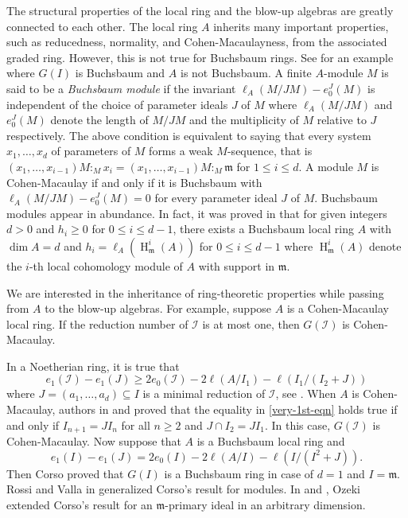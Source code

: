 \documentclass[11pt,reqno]{amsart}
\theoremstyle{definition}
\newcommand{\m}{\mathfrak m}
\def\I{{\mathcal I}}
\DeclareMathOperator{\h}{H}
\numberwithin{equation}{section}
\begin{document}
	The structural properties of the local ring and the blow-up algebras are greatly connected to each other. The local ring $A$ inherits many important properties, such as reducedness, normality, and Cohen-Macaulayness, from the associated graded ring. 
	However, this is not true for Buchsbaum rings. See \cite[Example 4.10]{G84} for an example where $G(I)$ is Buchsbaum and $A$ is not Buchsbaum. A finite $A$-module $M$ is said to be a {\textit{Buchsbaum module}} if the invariant $\ell_A(M/JM)-e_0^J(M)$ is independent of the choice of parameter ideals $J$ of $M$ where $\ell_A(M/JM)$ and $e_0^J(M)$ denote the length of $M/JM$ and the multiplicity of $M$ relative to $J$ respectively. The above condition is equivalent to saying that every system $x_1,\ldots, x_d$ of parameters of $M$ forms a weak $M$-sequence, that is
	$ (x_1,\ldots,x_{i-1})M:_M x_i=(x_1,\ldots,x_{i-1})M:_M \m$ for $1\leq i\leq d.$  A module $M$ is Cohen-Macaulay if and only if it is Buchsbaum with $\ell_A(M/JM)-e_0^J(M)=0$ for every parameter ideal $J$ of $M$. Buchsbaum modules appear in abundance. In fact, it was proved in \cite[Theorem 1.1]{Go1} that for given integers $d>0$ and $h_i\geq 0$ for $0\leq i\leq d-1$,  there exists a Buchsbaum local ring $A$ with $\dim A=d$ and $h_i=\ell_A(\h_\m^i(A))$ for $0\leq i\leq d-1$ where $\h_\m^i(A)$ denote the $i$-th local cohomology module of $A$ with support in $\m$.

    	We are interested in the inheritance of ring-theoretic properties while passing from $A$ to the blow-up algebras. For example, suppose $A$ is a Cohen-Macaulay local ring. If the reduction number of $\I$ is at most one, then $G(\I)$ is Cohen-Macaulay.

        In a Noetherian ring, it is true that
    \begin{equation}\label{very-1st-eqn}
		 e_1(\I)-e_1(J)\geq 2e_0(\I)-2\ell(A/I_1)-\ell(I_1/(I_2+J)) \end{equation}
     where $J=(a_1,\ldots,a_d)\subseteq I$ is a minimal reduction of $\I$, see
	 \cite[Theorem 2.4]{rossi-valla}. 
     When $A$ is Cohen-Macaulay, 
	 authors in \cite{elias-valla} and \cite{GR} proved that the equality  in \eqref{very-1st-eqn}     %
    holds true if and only if $I_{n+1}=JI_n$ for all $n\geq 2$ and $J\cap I_2=JI_1$. In this case,  $G(\I)$ is Cohen-Macaulay. %
    Now suppose that $A$ is a Buchsbaum local ring and \begin{equation}\label{very-2nd-eqn}
		e_1(I)-e_1(J)= 2e_0(I)-2\ell(A/I)-\ell(I/(I^2+J)). \end{equation}
	Then Corso \cite{Corso09} proved that $G(I)$  is a Buchsbaum ring in case of $d=1$ and $I=\m$.  Rossi and Valla in \cite[Theorem 2.1]{rossi-valla}
		 generalized Corso's result for modules. In \cite{ozeki12} and  \cite{ozeki13}, Ozeki extended Corso's result for an $
		 \m$-primary ideal in an arbitrary dimension.
\end{document}
